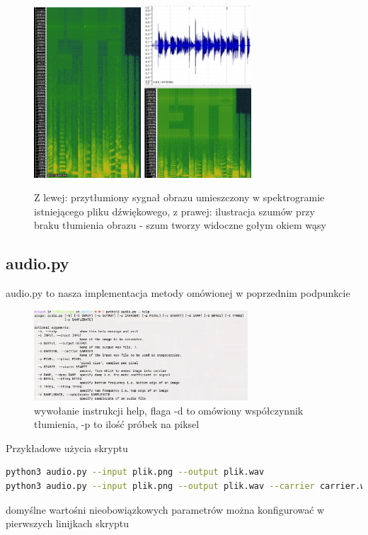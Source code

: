 \documentclass{article}
\begin{document}
\begin{figure}[H]
	\centering
	\includegraphics[width=4cm]{gorszajakosc_spektro}
	\includegraphics[width=4cm]{szumy_spektro}
	\caption{Z lewej: przytłumiony sygnał obrazu umieszczony w spektrogramie istniejącego pliku dźwiękowego, z prawej: ilustracja szumów przy braku tłumienia obrazu - szum tworzy widoczne gołym okiem wąsy}
\end{figure}
\subsection*{audio.py}
audio.py to nasza implementacja metody omówionej w poprzednim podpunkcie
\begin{figure}[H]
	\centering
	\includegraphics[width=8cm]{audiopyhelp}
	\caption{wywołanie instrukcji help,  flaga -d to omówiony współczynnik tłumienia, -p to ilość 
	próbek na piksel }
\end{figure}
Przykładowe użycia skryptu
\begin{lstlisting}[language=bash]
python3 audio.py --input plik.png --output plik.wav
python3 audio.py --input plik.png --output plik.wav --carrier carrier.wav
\end{lstlisting}
domyślne wartośni nieobowiązkowych parametrów można konfigurować w pierwszych linijkach skryptu
\end{document}
